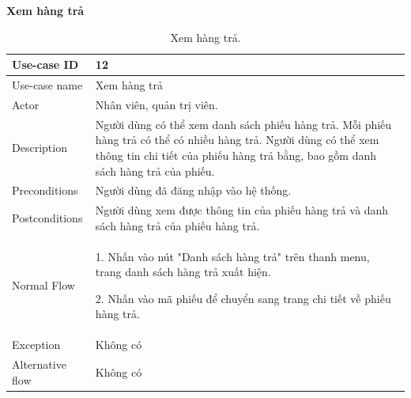 \textbf{Xem hàng trả}
\begin{table}[!htp]
    \centering
    \begin{tabular}{|m{3cm}|m{10cm}|}
    \hline 
        Use-case ID & 12\\ \hline
        Use-case name & Xem hàng trả\\ \hline
        Actor & Nhân viên, quản trị viên.\\ \hline
        Description & Người dùng có thể xem danh sách phiếu hàng trả. Mỗi phiếu hàng trả có thể có nhiều hàng trả. Người dùng có thể xem thông tin chi tiết của phiếu hàng trả bằng, bao gồm danh sách hàng trả của phiếu.\\ \hline
        Preconditions & Người dùng đã đăng nhập vào hệ thống.\\ \hline
        Postconditions & Người dùng xem được thông tin của phiếu hàng trả và danh sách hàng trả của phiếu hàng trả.\\ \hline
        Normal Flow & 
        1. Nhấn vào nút "Danh sách hàng trả" trên thanh menu, trang danh sách hàng trả xuất hiện.\par
        2. Nhấn vào mã phiếu để chuyển sang trang chi tiết về phiếu hàng trả.
        \\ \hline
        Exception & Không có\\ \hline
        Alternative flow & Không có\\ 
    \hline 
    \end{tabular}
    \caption{Xem hàng trả.}
    \label{bang12}
\end{table}

